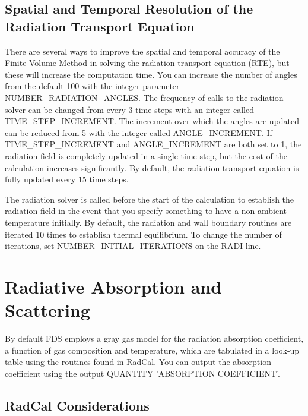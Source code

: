 \documentclass[11pt]{book}
\begin{document}
\subsection{Spatial and Temporal Resolution of the Radiation Transport Equation}

\label{info:RADI_Resolution}

There are several ways to improve the spatial and temporal accuracy of the Finite Volume Method in solving the radiation transport equation (RTE), but these will increase the computation time. You can increase the number of angles from the default 100 with the integer parameter {\ct NUMBER\_RADIATION\_ANGLES}. The frequency of calls to the radiation solver can be changed from every 3 time steps with an integer called {\ct TIME\_STEP\_INCREMENT}. The increment over which the angles are updated can be reduced from 5 with the integer called {\ct ANGLE\_INCREMENT}. If {\ct TIME\_STEP\_INCREMENT} and {\ct ANGLE\_INCREMENT} are both set to 1, the radiation field is completely updated in a single time step, but the cost of the calculation increases significantly. By default, the radiation transport equation is fully updated every 15 time steps.

The radiation solver is called before the start of the calculation to establish the radiation field in the event that you specify something to have a non-ambient temperature initially. By default, the radiation and wall boundary routines are iterated 10 times to establish thermal equilibrium. To change the number of iterations, set {\ct NUMBER\_INITIAL\_ITERATIONS} on the {\ct RADI} line.



\section{Radiative Absorption and Scattering}
\label{info:RADI_RADCAL_Absorption}

By default FDS employs a gray gas model for the radiation absorption coefficient, a function
of gas composition and temperature, which are
tabulated in a look-up table using the routines found in RadCal. You can output the absorption coefficient using the output {\ct QUANTITY} {\ct 'ABSORPTION COEFFICIENT'}.

\subsection{RadCal Considerations}

\label{info:RadCal}
\end{document}
